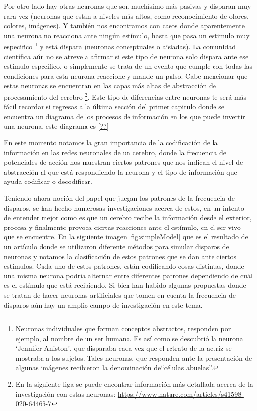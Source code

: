 Por otro lado hay otras neuronas que son muchísimo más pasivas y disparan muy rara vez (neuronas que están a niveles más altos, como reconocimiento de olores, colores, imágenes). Y también nos encontramos con casos donde aparentemente una neurona no reacciona ante ningún estímulo, hasta que pasa un estimulo muy especifico \footnote{Neuronas individuales que forman conceptos abstractos, responden por ejemplo, al nombre de un ser humano. Es así como se descubrió la neurona ‘Jennifer Aniston’, que disparaba cada vez que el retrato de la actriz se mostraba a los sujetos. Tales neuronas, que responden ante la presentación de algunas imágenes recibieron la denominación de“células abuelas”.} y está dispara (neuronas conceptuales o aisladas). La comunidad científica aún no se atreve a afirmar si este tipo de neurona solo dispara ante ese estímulo especifico, o simplemente se trata de un evento que cumple con todas las condiciones para esta neurona reaccione y mande un pulso. Cabe mencionar que estas neuronas se encuentran en las capas más altas de abstracción de procesamiento del cerebro \footnote{En la siguiente liga se puede encontrar información más detallada acerca de la investigación con estas neuronas: \url{https://www.nature.com/articles/s41598-020-64466-7}}. Este tipo de diferencias entre neuronas te será más fácil recordar si regresas a la última sección del primer capitulo donde se encuentra un diagrama de los procesos de información en los que puede invertir una neurona, este diagrama es \ref{??}

En este momento notamos la gran importancia de la codificación de la información en las redes neuronales de un cerebro, donde la frecuencia de potenciales de acción nos muestran ciertos patrones que nos indican el nivel de abstracción al que está respondiendo la neurona y el tipo de información que ayuda codificar o decodificar. 

Teniendo ahora noción del papel que juegan los patrones de la frecuencia de disparos, se han hecho numerosas investigaciones acerca de estos, en un intento de entender mejor como es que un cerebro recibe la información desde el exterior, procesa y finalmente provoca ciertas reacciones ante el estímulo, en el ser vivo que se encuentre. En la siguiente imagen \ref{fig:simpleModel} que es el resultado de un artículo donde se utilizaron diferente métodos para simular disparos de neuronas y notamos la clasificación de estos patrones que se dan ante ciertos estímulos. Cada uno de estos patrones, están codificando cosas distintas, donde una misma neurona podría alternar entre diferentes patrones dependiendo de cuál es el estímulo que está recibiendo.
Si bien han habido algunas propuestas donde se tratan de hacer neuronas artificiales que tomen en cuenta la frecuencia de disparos aún hay un amplio campo de investigación en este tema.

